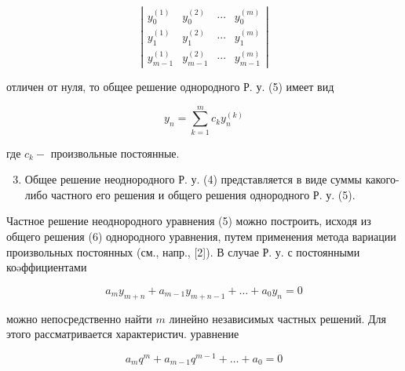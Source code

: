 \documentclass[10pt]{article}
\begin{document}
\[

\left|\begin{array}{cccc}

y_{0}^{(1)} & y_{0}^{(2)} & \cdots & y_{0}^{(m)} \\

y_{1}^{(1)} & y_{1}^{(2)} & \cdots & y_{1}^{(m)} \\

y_{m-1}^{(1)} & y_{m-1}^{(2)} & \cdots & y_{m-1}^{(m)}

\end{array}\right|

\]



отличен от нуля, то общее решение однородного Р. у. (5) имеет вид



\[

y_{n}=\sum_{k=1}^{m} c_{k} y_{n}^{(k)}

\]



где $c_{k}-$ произвольные постоянные.



\begin{enumerate}

  \setcounter{enumi}{2}

  \item Общее решение неоднородного Р. у. (4) представляется в виде суммы какого-либо частного его решения и общего решения однородного Р. у. (5).

\end{enumerate}



Частное решение неоднородного уравнения (5) можно построить, исходя из общего решения (6) однородного уравнения, путем применения метода вариации произвольных постоянных (см., напр., [2]). В случае Р. у. с постоянными коəффициентами



\[

a_{m} y_{m+n}+a_{m-1} y_{m+n-1}+\ldots+a_{0} y_{n}=0

\]



можно непосредственно найти $m$ линейно независимых частных решений. Для этого рассматривается характеристич. уравнение



\[

a_{m} q^{m}+a_{m-1} q^{m-1}+\ldots+a_{0}=0

\]
\end{document}
